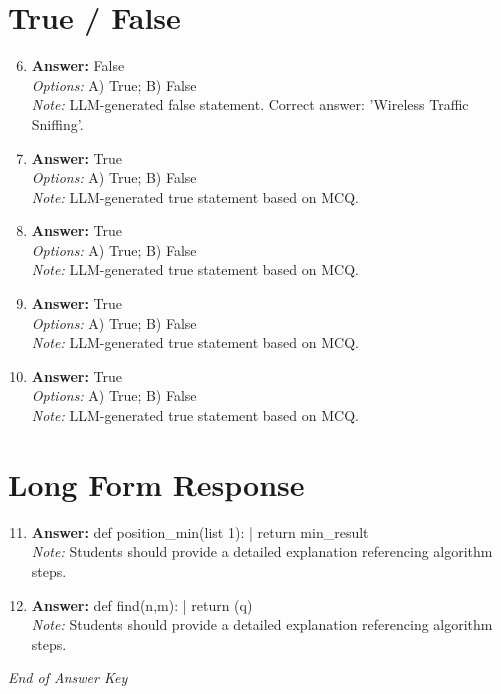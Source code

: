 \documentclass[12pt]{article}
\begin{document}
\section*{True / False}
\begin{enumerate}[label=\arabic*.]
\setcounter{enumi}{5}
\item \textbf{Answer:} False
\\ \textit{Options:} A) True; B) False
\\ \textit{Note:} LLM-generated false statement. Correct answer: 'Wireless Traffic Sniffing'.
\item \textbf{Answer:} True
\\ \textit{Options:} A) True; B) False
\\ \textit{Note:} LLM-generated true statement based on MCQ.
\item \textbf{Answer:} True
\\ \textit{Options:} A) True; B) False
\\ \textit{Note:} LLM-generated true statement based on MCQ.
\item \textbf{Answer:} True
\\ \textit{Options:} A) True; B) False
\\ \textit{Note:} LLM-generated true statement based on MCQ.
\item \textbf{Answer:} True
\\ \textit{Options:} A) True; B) False
\\ \textit{Note:} LLM-generated true statement based on MCQ.
\end{enumerate}

\section*{Long Form Response}
\begin{enumerate}[label=\arabic*.]
\setcounter{enumi}{10}
\item \textbf{Answer:} def position\_min(list 1): | return min\_result
\\ \textit{Note:} Students should provide a detailed explanation referencing algorithm steps.
\item \textbf{Answer:} def find(n,m): | return (q)
\\ \textit{Note:} Students should provide a detailed explanation referencing algorithm steps.
\end{enumerate}

\vfill
\noindent\textit{End of Answer Key}
\end{document}
